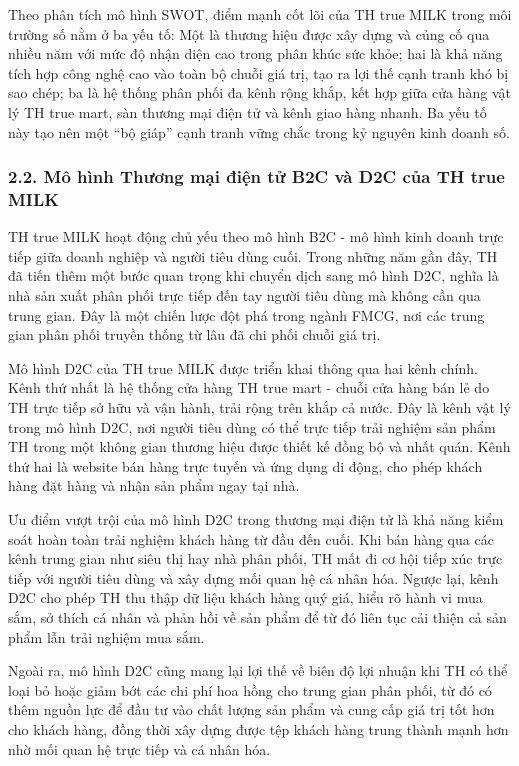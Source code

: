 Theo phân tích mô hình SWOT, điểm mạnh cốt lõi của TH true MILK trong
môi trường số nằm ở ba yếu tố: Một là thương hiệu được xây dựng và củng
cố qua nhiều năm với mức độ nhận diện cao trong phân khúc sức khỏe; hai
là khả năng tích hợp công nghệ cao vào toàn bộ chuỗi giá trị, tạo ra lợi
thế cạnh tranh khó bị sao chép; ba là hệ thống phân phối đa kênh rộng
khắp, kết hợp giữa cửa hàng vật lý TH true mart, sàn thương mại điện tử
và kênh giao hàng nhanh. Ba yếu tố này tạo nên một ``bộ giáp'' cạnh
tranh vững chắc trong kỷ nguyên kinh doanh số.

\subsubsection{2.2. Mô hình Thương mại điện tử B2C và D2C của TH true
MILK}\label{muxf4-huxecnh-thux1b0ux1a1ng-mux1ea1i-ux111iux1ec7n-tux1eed-b2c-vuxe0-d2c-cux1ee7a-th-true-milk}

TH true MILK hoạt động chủ yếu theo mô hình B2C - mô hình kinh doanh
trực tiếp giữa doanh nghiệp và người tiêu dùng cuối. Trong những năm gần
đây, TH đã tiến thêm một bước quan trọng khi chuyển dịch sang mô hình
D2C, nghĩa là nhà sản xuất phân phối trực tiếp đến tay người tiêu dùng
mà không cần qua trung gian. Đây là một chiến lược đột phá trong ngành
FMCG, nơi các trung gian phân phối truyền thống từ lâu đã chi phối chuỗi
giá trị.

Mô hình D2C của TH true MILK được triển khai thông qua hai kênh chính.
Kênh thứ nhất là hệ thống cửa hàng TH true mart - chuỗi cửa hàng bán lẻ
do TH trực tiếp sở hữu và vận hành, trải rộng trên khắp cả nước. Đây là
kênh vật lý trong mô hình D2C, nơi người tiêu dùng có thể trực tiếp trải
nghiệm sản phẩm TH trong một không gian thương hiệu được thiết kế đồng
bộ và nhất quán. Kênh thứ hai là website bán hàng trực tuyến và ứng dụng
di động, cho phép khách hàng đặt hàng và nhận sản phẩm ngay tại nhà.

Ưu điểm vượt trội của mô hình D2C trong thương mại điện tử là khả năng
kiểm soát hoàn toàn trải nghiệm khách hàng từ đầu đến cuối. Khi bán hàng
qua các kênh trung gian như siêu thị hay nhà phân phối, TH mất đi cơ hội
tiếp xúc trực tiếp với người tiêu dùng và xây dựng mối quan hệ cá nhân
hóa. Ngược lại, kênh D2C cho phép TH thu thập dữ liệu khách hàng quý
giá, hiểu rõ hành vi mua sắm, sở thích cá nhân và phản hồi về sản phẩm
để từ đó liên tục cải thiện cả sản phẩm lẫn trải nghiệm mua sắm.

Ngoài ra, mô hình D2C cũng mang lại lợi thế về biên độ lợi nhuận khi TH
có thể loại bỏ hoặc giảm bớt các chi phí hoa hồng cho trung gian phân
phối, từ đó có thêm nguồn lực để đầu tư vào chất lượng sản phẩm và cung
cấp giá trị tốt hơn cho khách hàng, đồng thời xây dựng được tệp khách
hàng trung thành mạnh hơn nhờ mối quan hệ trực tiếp và cá nhân hóa.

